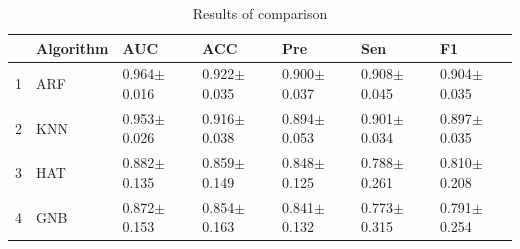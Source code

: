 \begin{table}
\footnotesize
\caption{Results of comparison}
\label{tab:comparison}
\begin{tabular}{lllllll}
\hline
 & Algorithm & AUC & ACC & Pre & Sen & F1 \\
\hline
1 & ARF & 0.964$\pm$0.016 & 0.922$\pm$0.035 & 0.900$\pm$0.037 & 0.908$\pm$0.045 & 0.904$\pm$0.035 \\
2 & KNN & 0.953$\pm$0.026 & 0.916$\pm$0.038 & 0.894$\pm$0.053 & 0.901$\pm$0.034 & 0.897$\pm$0.035 \\
3 & HAT & 0.882$\pm$0.135 & 0.859$\pm$0.149 & 0.848$\pm$0.125 & 0.788$\pm$0.261 & 0.810$\pm$0.208 \\
4 & GNB & 0.872$\pm$0.153 & 0.854$\pm$0.163 & 0.841$\pm$0.132 & 0.773$\pm$0.315 & 0.791$\pm$0.254 \\
\hline
\end{tabular}
\end{table}
